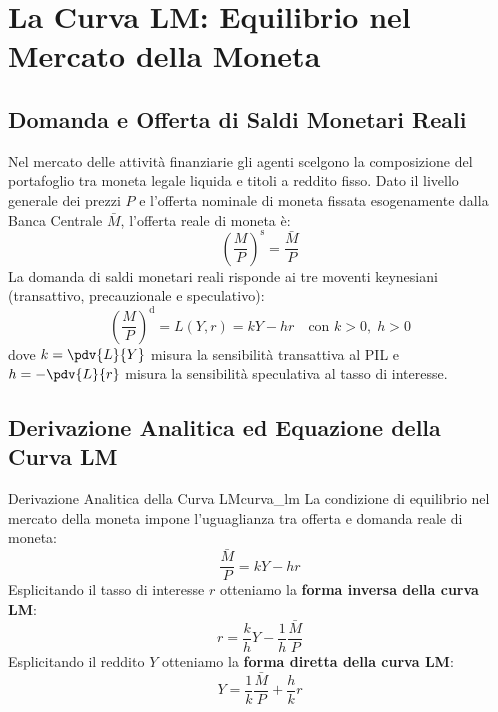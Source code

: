\section{La Curva LM: Equilibrio nel Mercato della Moneta}

\subsection{Domanda e Offerta di Saldi Monetari Reali}
Nel mercato delle attività finanziarie gli agenti scelgono la composizione del portafoglio tra moneta legale liquida e titoli a reddito fisso.
Dato il livello generale dei prezzi $P$ e l'offerta nominale di moneta fissata esogenamente dalla Banca Centrale $\bar{M}$, l'offerta reale di moneta è:
\begin{equation}
    \left(\frac{M}{P}\right)^{\mathrm{s}} = \frac{\bar{M}}{P}
\end{equation}
La domanda di saldi monetari reali risponde ai tre moventi keynesiani (transattivo, precauzionale e speculativo):
\begin{equation}
    \left(\frac{M}{P}\right)^{\mathrm{d}} = L(Y, r) = k Y - h r \quad \text{con } k > 0, \; h > 0
\end{equation}
dove $k = \pdv{L}{Y}$ misura la sensibilità transattiva al PIL e $h = -\pdv{L}{r}$ misura la sensibilità speculativa al tasso di interesse.

\subsection{Derivazione Analitica ed Equazione della Curva LM}

\begin{modello}{Derivazione Analitica della Curva LM}{curva_lm}
La condizione di equilibrio nel mercato della moneta impone l'uguaglianza tra offerta e domanda reale di moneta:
\begin{equation}
    \frac{\bar{M}}{P} = k Y - h r
\end{equation}
Esplicitando il tasso di interesse $r$ otteniamo la \textbf{forma inversa della curva LM}:
\begin{equation}
    r = \frac{k}{h} Y - \frac{1}{h}\frac{\bar{M}}{P} \label{eq:lm_inversa}
\end{equation}
Esplicitando il reddito $Y$ otteniamo la \textbf{forma diretta della curva LM}:
\begin{equation}
    Y = \frac{1}{k}\frac{\bar{M}}{P} + \frac{h}{k} r \label{eq:lm_diretta}
\end{equation}
\end{modello}

